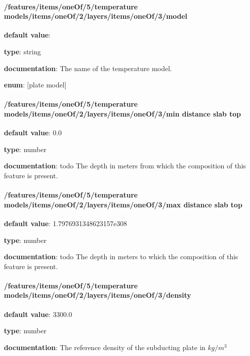 \paragraph{/features/items/oneOf/5/temperature models/items/oneOf/2/layers/items/oneOf/3/model} \begin{itemized}
\item {\bf default value}: 
\item {\bf type}: string
\item {\bf documentation}: The name of the temperature model.
\item {\bf enum}: [plate model]\end{itemized}\paragraph{/features/items/oneOf/5/temperature models/items/oneOf/2/layers/items/oneOf/3/min distance slab top} \begin{itemized}
\item {\bf default value}: 0.0
\item {\bf type}: number
\item {\bf documentation}: todo The depth in meters from which the composition of this feature is present.
\end{itemized}\paragraph{/features/items/oneOf/5/temperature models/items/oneOf/2/layers/items/oneOf/3/max distance slab top} \begin{itemized}
\item {\bf default value}: 1.7976931348623157e308
\item {\bf type}: number
\item {\bf documentation}: todo The depth in meters to which the composition of this feature is present.
\end{itemized}\paragraph{/features/items/oneOf/5/temperature models/items/oneOf/2/layers/items/oneOf/3/density} \begin{itemized}
\item {\bf default value}: 3300.0
\item {\bf type}: number
\item {\bf documentation}: The reference density of the subducting plate in $kg/m^3$

\end{itemized}
